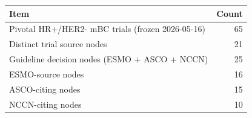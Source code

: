 \begin{tabular}{lr}\toprule
Item & Count \\ \midrule
Pivotal HR+/HER2- mBC trials (frozen 2026-05-16) & 65 \\
Distinct trial source nodes & 21 \\
Guideline decision nodes (ESMO + ASCO + NCCN) & 25 \\
ESMO-source nodes & 16 \\
ASCO-citing nodes & 15 \\
NCCN-citing nodes & 10 \\
\bottomrule\end{tabular}
